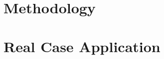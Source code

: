 \documentclass[11pt]{article}
\begin{document}
%	
%	
%	
%	

	\section{Methodology}
	
	
	\section{Real Case Application}
	
	
	\clearpage
	
	
	
	
\end{document}
